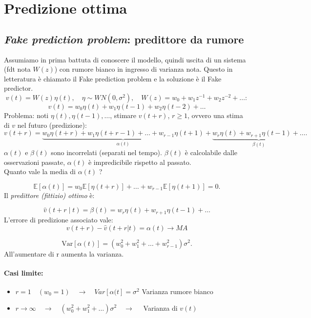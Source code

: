 \documentclass[11pt,a4paper]{article}
\begin{document}
\section{Predizione ottima}

\subsection{\emph{Fake prediction problem}: predittore da rumore}
Assumiamo in prima battuta di conoscere il modello, quindi uscita di un sistema (fdt nota $W(z)$) con rumore bianco in ingresso di varianza nota. Questo in letteratura è chiamato il Fake prediction problem e la soluzione è il Fake predictor. 
\[
v(t)=W(z)\eta(t), \quad \eta\sim WN(0,\sigma^2), \quad W(z)=w_0+w_1 z^{-1}+w_2 z^{-2}+\dots:
\]
\[
v(t)=w_0\eta(t)+w_1\eta(t-1)+w_2\eta(t-2)+\dots
\]
Problema: noti $\eta(t),\eta(t-1),\dots$, stimare $v(t+r)$, $r\ge1$, ovvero una stima di $v$ nel futuro (predizione):
\[
v(t+r)=\underbrace{w_0\eta(t+r)+w_1\eta(t+r-1)+\dots+w_{r-1}\eta(t+1)}_{\alpha(t)}+\underbrace{w_r\eta(t)+w_{r+1}\eta(t-1)+\dots}_{\beta(t)}.
\]
$\alpha(t)$ e $\beta(t)$ sono incorrelati (separati nel tempo). $\beta(t)$ è calcolabile dalle osservazioni passate, $\alpha(t)$ è impredicibile rispetto al passato. \\
Quanto vale la media di $\alpha(t)$ ?

\[
 \mathbb{E}[\alpha(t)]=w_0\mathbb{E}[\eta(t+r)]+\dots+w_{r-1}\mathbb{E}[\eta(t+1)] =0. 
\]
Il \emph{predittore (fittizio) ottimo} è:

\[
\hat v(t+r\mid t)=\beta(t)=w_r\eta(t)+w_{r+1}\eta(t-1)+\dots
\]
L'errore di predizione associato vale:
\[
v(t+r) - \hat{v}(t+r| t) =\alpha(t) \rightarrow MA
\]

\[
\mathrm{Var}[\alpha(t)]=(w_0^2+w_1^2+\dots+w_{r-1}^2)\sigma^2.
\]
All'aumentare di r aumenta la varianza. \\
\paragraph{Casi limite:}
\begin{itemize}
    \item $r=1 \quad (w_0 = 1) \quad \rightarrow \quad Var[\alpha(t] = \sigma^2$ Varianza rumore bianco
    \item $r\to\infty \quad \rightarrow \quad (w_0^2+w_1^2+\dots)\sigma^2 \quad \rightarrow \quad $ Varianza di $v(t)$ 
\end{itemize} 
\end{document}
